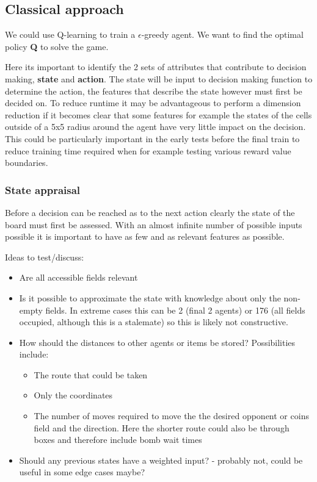 \documentclass[12pt]{report}
\begin{document}
\subsection{Classical approach}
We could use Q-learning to train a $\epsilon$-greedy agent. We want to find the optimal policy \textbf{Q} to solve the game.

Here its important to identify the 2 sets of attributes that contribute to decision making, \textbf{state} and \textbf{action}. The state will be input to decision making function to determine the action, the features that describe the state however must first be decided on.
To reduce runtime it may be advantageous to perform a dimension reduction if it becomes clear that some features for example the states of the cells outside of a 5x5 radius around the agent have very little impact on the decision. This could be particularly important in the early tests before the final train to reduce training time required when for example testing various reward value boundaries.

\subsubsection{State appraisal}
Before a decision can be reached as to the next action clearly the state of the board must first be assessed. With an almost infinite number of possible inputs possible it is important to have as few and as relevant features as possible.

Ideas to test/discuss:
\begin{itemize}
	\item Are all accessible fields relevant
	\item Is it possible to approximate the state with knowledge about only the non-empty fields. In extreme cases this can be 2 (final 2 agents) or 176 (all fields occupied, although this is a stalemate) so this is likely not constructive.
	\item How should the distances to other agents or items be stored? Possibilities include:
	\begin{itemize}
	\item The route that could be taken
	\item Only the coordinates
	\item The number of moves required to move the the desired opponent or coins field and the direction. Here the shorter route could also be through boxes and therefore include bomb wait times
	\end{itemize}	 
	\item Should any previous states have a weighted input? - probably not, could be useful in some edge cases maybe?
\end{itemize}
\end{document}
